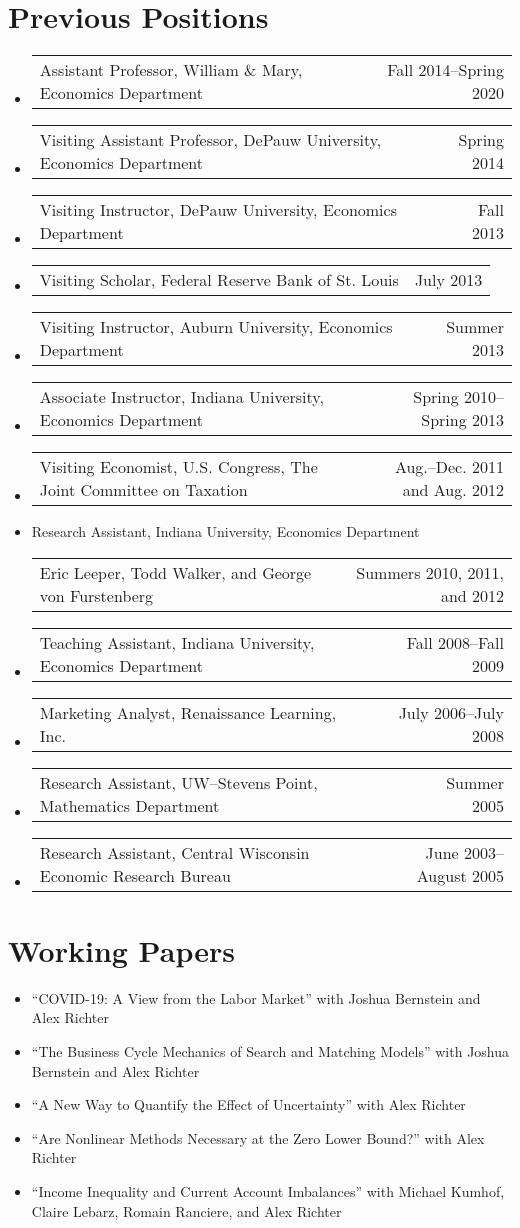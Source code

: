 \documentclass[10pt,letterpaper,en-US]{article}
\makeatletter
\newcommand{\itemrow}[2]
{\begin{tabular*}{\linewidth}{l@{\extracolsep{\fill}}r}
	#1 & #2 \\
\end{tabular*}}
\makeatother
\begin{document}
\section*{Previous Positions}
\begin{itemize}\allowbreak
\item \itemrow{Assistant Professor, William \& Mary, Economics Department}{Fall 2014--Spring 2020}
\item \itemrow{Visiting Assistant Professor, DePauw University, Economics Department}{Spring 2014}
\item \itemrow{Visiting Instructor, DePauw University, Economics Department}{Fall 2013}
\item \itemrow{Visiting Scholar, Federal Reserve Bank of St. Louis}{July 2013}
\item \itemrow{Visiting Instructor, Auburn University, Economics Department}{Summer 2013}
\item \itemrow{Associate Instructor, Indiana University, Economics Department}{Spring 2010--Spring 2013}
\item \itemrow{Visiting Economist, U.S. Congress, The Joint Committee on Taxation}{Aug.--Dec. 2011 and Aug. 2012}
\item Research Assistant, Indiana University, Economics Department \\
        \itemrow{\hspace{.25in}Eric Leeper, Todd Walker, and George von Furstenberg}{Summers 2010, 2011, and 2012}
\item \itemrow{Teaching Assistant, Indiana University, Economics Department}{Fall 2008--Fall 2009}
\item \itemrow{Marketing Analyst, Renaissance Learning, Inc.}{July 2006--July 2008}
\item \itemrow{Research Assistant, UW--Stevens Point, Mathematics Department}{Summer 2005}
\item \itemrow{Research Assistant, Central Wisconsin Economic Research Bureau}{June 2003--August 2005}
\end{itemize}
\newpage

\section*{Working Papers}
\begin{itemize}
\item ``COVID-19: A View from the Labor Market'' with Joshua Bernstein and Alex Richter
\item ``The Business Cycle Mechanics of Search and Matching Models'' with Joshua Bernstein and Alex Richter
\item ``A New Way to Quantify the Effect of Uncertainty'' with Alex Richter
\item ``Are Nonlinear Methods Necessary at the Zero Lower Bound?'' with Alex Richter
\item ``Income Inequality and Current Account Imbalances'' with Michael Kumhof, Claire Lebarz, Romain Ranciere, and Alex Richter
\end{itemize}
\end{document}
